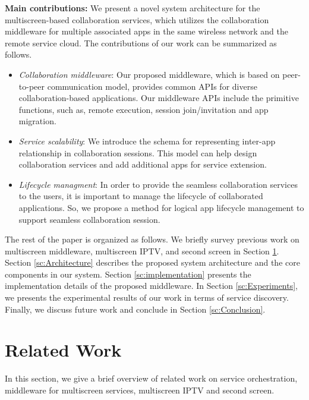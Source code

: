 \documentclass[conference]{IEEEtran}
\newcommand{\bi}{\begin{itemize}}
\newcommand{\ei}{\end{itemize}}
\newcommand{\ii}{\item}
\begin{document}
\noindent
\textbf{Main contributions:} We present a novel system architecture for the multiscreen-based collaboration services, which utilizes the collaboration middleware for multiple associated apps in the same wireless network and the remote service cloud. The contributions of our work can be summarized as follows.
\bi
\ii \textit{Collaboration middleware}: 
Our proposed middleware, which is based on peer-to-peer communication model, provides common APIs for diverse collaboration-based applications. Our middleware APIs include the primitive functions, such as, remote execution, session join/invitation and app migration.
\ii \textit{Service scalability}: 
We introduce the schema for representing inter-app relationship in collaboration sessions. This model can help design collaboration services and add additional apps for service extension. 
\ii \textit{Lifecycle managment}: In order to provide the seamless collaboration services to the users, it is important to manage the lifecycle of  collaborated applications.  So, we propose a method for logical app lifecycle management  to  support seamless collaboration session.
\ei

The rest of the paper is organized as follows.
We briefly survey previous work on multiscreen middleware, multiscreen IPTV, and second screen in Section \ref{sc:RelatedWork}.
Section \ref{sc:Architecture} describes the proposed system architecture and the core components in our system.
Section \ref{sc:implementation} presents the implementation details of the proposed middleware.
In Section \ref{sc:Experiments}, we  presents the experimental results of our work in terms of service discovery.
Finally, we discuss future work and conclude in Section \ref{sc:Conclusion}.

\section{Related Work}
\label{sc:RelatedWork}
In this section, we give a brief overview of related work on service orchestration, middleware for multiscreen services, multiscreen IPTV and second screen.\\ 
\end{document}
